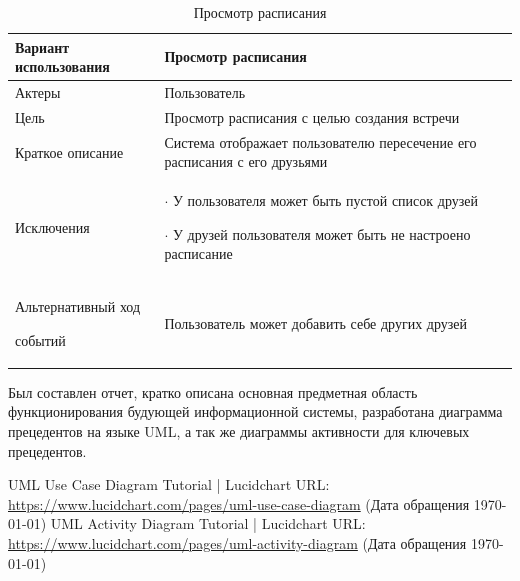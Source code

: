 \documentclass[14pt]{extreport}
\begin{document}
    \begin{table}[H]

        \begin{center}
        \caption{Просмотр расписания \label{table2}}
        \begin{tabular}{|p{5.5cm}|p{10.7cm}|}
        \hline
        Вариант использования & Просмотр расписания \\
        \hline
        Актеры
         & Пользователь
         \\
        \hline
        Цель
         & Просмотр расписания с целью создания встречи 
         \\
        \hline
        Краткое описание
         & Система отображает пользователю пересечение его расписания с его друзьями 
         \\
        \hline
        Исключения
         & 
        $\cdot$ У пользователя может быть пустой список друзей 
        
        $\cdot$ У друзей пользователя может быть не настроено расписание 
         \\
        \hline
        Альтернативный ход 
        
        событий
        & Пользователь может добавить себе других друзей \\
        
        \hline
        \end{tabular}
        \end{center}
        \end{table}
    

\conclusions
Был составлен отчет, кратко описана основная предметная область функционирования будующей информационной системы, разработана диаграмма прецедентов на языке UML, а так же диаграммы активности для ключевых прецедентов.

\newpage
\begin{thebibliography}{99}
	 	UML Use Case Diagram Tutorial | Lucidchart URL: \url{https://www.lucidchart.com/pages/uml-use-case-diagram} (Дата обращения \today)
     	UML Activity Diagram Tutorial | Lucidchart URL: \url{https://www.lucidchart.com/pages/uml-activity-diagram} (Дата обращения \today)
\end{thebibliography}
\end{document}
